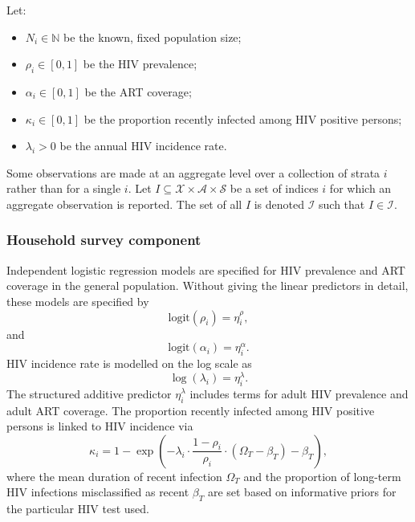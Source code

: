 \documentclass[a4paper, nobind]{templates/ociamthesis}
\providecommand{\tightlist}{%
  \setlength{\itemsep}{0pt}\setlength{\parskip}{0pt}}
\begin{document}
Let:

\begin{itemize}
\tightlist
\item
  \(N_i \in \mathbb{N}\) be the known, fixed population size;
\item
  \(\rho_i \in [0, 1]\) be the HIV prevalence;
\item
  \(\alpha_i \in [0, 1]\) be the ART coverage;
\item
  \(\kappa_i \in [0, 1]\) be the proportion recently infected among HIV positive persons;
\item
  \(\lambda_i > 0\) be the annual HIV incidence rate.
\end{itemize}

Some observations are made at an aggregate level over a collection of strata \(i\) rather than for a single \(i\).
Let \(I \subseteq \mathcal{X} \times \mathcal{A} \times \mathcal{S}\) be a set of indices \(i\) for which an aggregate observation is reported.
The set of all \(I\) is denoted \(\mathcal{I}\) such that \(I \in \mathcal{I}\).

\hypertarget{household}{%
\subsubsection{Household survey component}\label{household}}

Independent logistic regression models are specified for HIV prevalence and ART coverage in the general population.
Without giving the linear predictors in detail, these models are specified by
\begin{equation}
\text{logit}(\rho_i) = \eta^\rho_i, \label{eq:rho}
\end{equation}
and
\begin{equation}
\text{logit}(\alpha_i) = \eta^\alpha_i. \label{eq:alpha}
\end{equation}
HIV incidence rate is modelled on the log scale as
\begin{equation}
\log(\lambda_i) = \eta^\lambda_i. \label{eq:lambda}
\end{equation}
The structured additive predictor \(\eta^\lambda_i\) includes terms for adult HIV prevalence and adult ART coverage.
The proportion recently infected among HIV positive persons is linked to HIV incidence via
\begin{equation}
\kappa_i = 1- \exp \left( - \lambda_i \cdot \frac{1 - \rho_i}{\rho_i} \cdot (\Omega_T - \beta_T) - \beta_T \right), \label{eq:kappa}
\end{equation}
where the mean duration of recent infection \(\Omega_T\) and the proportion of long-term HIV infections misclassified as recent \(\beta_T\) are set based on informative priors for the particular HIV test used.
\end{document}
